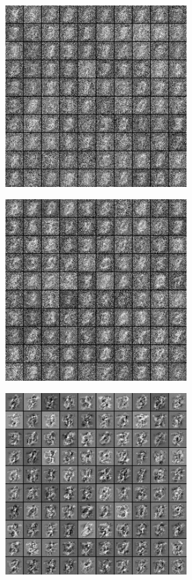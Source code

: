 \documentclass[a4paper]{scrartcl}
\begin{document}
\begin{minipage}[t]{0.5\textwidth}
\begin{center}
	\includegraphics[width=7cm]{images/filtry_5epoch_50train.png}
	\vspace{-1em}
	\end{center}
\end{minipage}
\begin{minipage}[t]{0.5\textwidth}
	\begin{center}
	\includegraphics[width=7cm]{images/filtry_10epoch_50train.png}
	\vspace{-1em}
	\end{center}
\end{minipage}
\begin{minipage}[t]{0.5\textwidth}
\begin{center}
\includegraphics[width=7cm]{images/filters_epoch500_train50.png}
\vspace{-1em}
\end{center}
\end{minipage}
\end{document}
